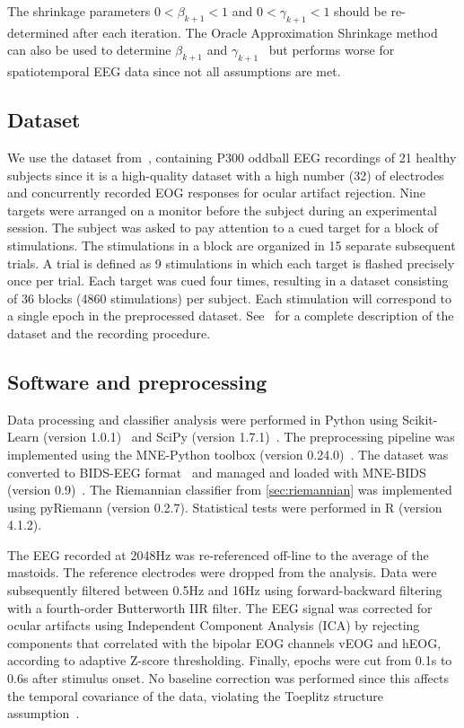 	The shrinkage parameters $0<\beta_{k+1}<1$ and $0<\gamma_{k+1}<1$ should be
	re-determined after each iteration.
	The Oracle Approximation Shrinkage method can also be used to determine
	$\beta_{k+1}$ and $\gamma_{k+1}$~\cite{Chen2010,Xie2021} but performs worse for spatiotemporal EEG data since not all assumptions are met.

	\subsection{Dataset}
	We use the dataset from~\cite{Wittevrongel2016}, containing P300 oddball EEG
	recordings of 21 healthy subjects since it is a high-quality dataset with a high
	number (32) of electrodes and concurrently recorded EOG responses for ocular artifact rejection.
	Nine targets were arranged on a monitor before the subject during an
	experimental session.
	The subject was asked to pay attention to a cued target for a block
	of stimulations.
	The stimulations in a block are organized in 15 separate subsequent trials.
	A trial is defined as 9 stimulations in which each target is flashed
	precisely once per trial.
	Each target was cued four times, resulting in a dataset consisting of 36 blocks
	(4860 stimulations) per subject.
	Each stimulation will correspond to a single epoch in the preprocessed dataset.
	See~\cite{Wittevrongel2016} for a complete description of the dataset and the recording procedure.

	\subsection{Software and preprocessing}
	Data processing and classifier analysis were performed in Python using
	Scikit-Learn (version 1.0.1)~\cite{Pedregosa2011} and SciPy (version
	1.7.1)~\cite{Virtanen2020}.
	The preprocessing pipeline was implemented using the MNE-Python toolbox
	(version 0.24.0)~\cite{Gramfort2013}.
	The dataset was converted to BIDS-EEG format~\cite{Pernet2019} and managed and
	loaded with MNE-BIDS (version 0.9)~\cite{Appelhoff2019}.
	The Riemannian classifier from \autoref{sec:riemannian} was implemented using
	pyRiemann (version 0.2.7).
	Statistical tests were performed in R (version 4.1.2).

	The EEG recorded at 2048Hz was re-referenced off-line to the average of the mastoids.
	The reference electrodes were dropped from the analysis.
	Data were subsequently filtered between 0.5Hz and 16Hz using forward-backward
	filtering with a fourth-order Butterworth IIR filter.
	The EEG signal was corrected for ocular artifacts using Independent Component
	Analysis (ICA) by rejecting components that correlated with the bipolar EOG channels vEOG and hEOG, according to adaptive Z-score thresholding.
	Finally, epochs were cut from 0.1s to 0.6s after stimulus onset.
	No baseline correction was performed since this affects the temporal covariance
	of the data, violating the Toeplitz structure assumption~\cite{Bijma2003}.

